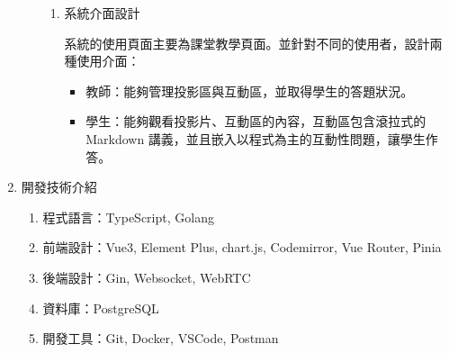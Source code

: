 \documentclass[12pt]{article}
\begin{document}
\begin{enumerate}
\begin{enumerate}
\begin{enumerate}[label=(\arabic*)]
          \item 系統介面設計
            \par 系統的使用頁面主要為課堂教學頁面。並針對不同的使用者，設計兩種使用介面：
            \begin{itemize}
              \item 教師：能夠管理投影區與互動區，並取得學生的答題狀況。
              \item 學生：能夠觀看投影片、互動區的內容，互動區包含滾拉式的 Markdown 講義，並且嵌入以程式為主的互動性問題，讓學生作答。
            \end{itemize}
          \end{enumerate}  
    \end{enumerate}
  \item 開發技術介紹
    \begin{enumerate}[label=(\arabic*)]
      \setlength{\parindent}{2em}
      \item 程式語言：TypeScript, Golang
      \item 前端設計：Vue3, Element Plus, chart.js, Codemirror, Vue Router, Pinia   
      \item 後端設計：Gin, Websocket, WebRTC
      \item 資料庫：PostgreSQL
      \item 開發工具：Git, Docker, VSCode, Postman
    \end{enumerate}
  

\end{enumerate}
\end{document}
